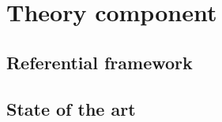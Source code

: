 \chapter{Theory component}

\section{Referential framework}



\section{State of the art}



\endinput

